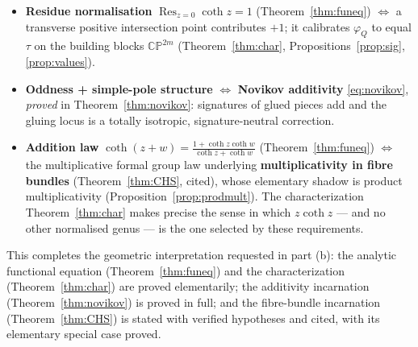 \documentclass[12pt]{article}
\theoremstyle{definition}
\begin{document}
\begin{itemize}
\item[(a)] \textbf{Residue normalisation} $\operatorname{Res}_{z=0}\coth z=1$
(Theorem~\ref{thm:funeq}) $\Leftrightarrow$ a transverse positive intersection point
contributes $+1$; it calibrates $\varphi_Q$ to equal $\tau$ on the building blocks
$\mathbb{CP}^{2m}$ (Theorem~\ref{thm:char}, Propositions~\ref{prop:sig},
\ref{prop:values}).
\item[(b)] \textbf{Oddness + simple-pole structure} $\Leftrightarrow$ \textbf{Novikov
additivity} \eqref{eq:novikov}, \emph{proved} in Theorem~\ref{thm:novikov}: signatures of
glued pieces add and the gluing locus is a totally isotropic, signature-neutral
correction.
\item[(c)] \textbf{Addition law} $\coth(z+w)=\frac{1+\coth z\coth w}{\coth z+\coth w}$
(Theorem~\ref{thm:funeq}) $\Leftrightarrow$ the multiplicative formal group law underlying
\textbf{multiplicativity in fibre bundles} (Theorem~\ref{thm:CHS}, cited), whose elementary
shadow is product multiplicativity (Proposition~\ref{prop:prodmult}). The
characterization Theorem~\ref{thm:char} makes precise the sense in which $z\coth z$ --- and
no other normalised genus --- is the one selected by these requirements.
\end{itemize}
This completes the geometric interpretation requested in part (b): the analytic functional
equation (Theorem~\ref{thm:funeq}) and the characterization (Theorem~\ref{thm:char}) are
proved elementarily; the additivity incarnation (Theorem~\ref{thm:novikov}) is proved in
full; and the fibre-bundle incarnation (Theorem~\ref{thm:CHS}) is stated with verified
hypotheses and cited, with its elementary special case proved.
\end{document}
